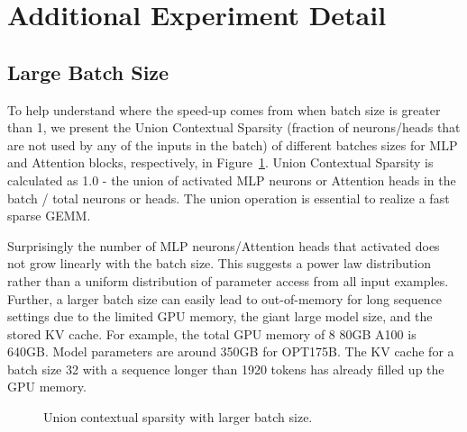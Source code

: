 \section{Additional Experiment Detail}
\label{sec:appendix-exp}
\subsection{Large Batch Size}
To help understand where the speed-up comes from when batch size is greater than 1, we present the Union Contextual Sparsity (fraction of neurons/heads that are not used by any of the inputs in the batch) of different batches sizes for MLP and Attention blocks, respectively, in Figure~\ref{appendix:exp_sparsity_batch}. Union Contextual Sparsity is calculated as 1.0 - the union of activated MLP neurons or Attention heads in the batch / total neurons or heads. The union operation is essential to realize a fast sparse GEMM. 

Surprisingly the number of MLP neurons/Attention heads that \name{} activated does not grow linearly with the batch size. This suggests a power law distribution rather than a uniform distribution of parameter access from all input examples. Further, a larger batch size can easily lead to out-of-memory for long sequence settings due to the limited GPU memory, the giant large model size, and the stored KV cache. For example, the total GPU memory of 8 80GB A100 is 640GB. Model parameters are around 350GB for OPT175B. The KV cache for a batch size 32 with a sequence longer than 1920 tokens has already filled up the GPU memory. 

\begin{figure}[h]
  \centering
  \caption{Union contextual sparsity with larger batch size.}
  \label{appendix:exp_sparsity_batch} 
\end{figure}
